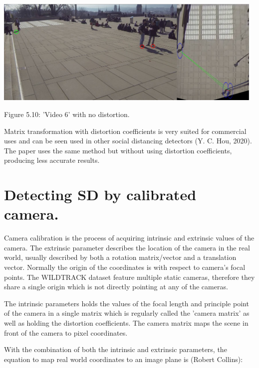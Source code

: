 \documentclass[12pt]{report}
\begin{document}
\begin{center}
	\includegraphics[width=130mm]{./images/appendix/UndistortedImageWithMatrixTransformation.JPG}
	
	{\footnotesize Figure 5.10: 'Video 6' with no distortion.}
\end{center}

Matrix transformation with distortion coefficients is very suited for commercial uses and can be seen used in other social distancing detectors (Y. C. Hou, 2020). The paper uses the same method but without using distortion coefficients, producing less accurate results.

\section{Detecting SD by calibrated camera.}

Camera calibration is the process of acquiring intrinsic and extrinsic values of the camera. The extrinsic parameter describes the location of the camera in the real world, usually described by both a rotation matrix/vector and a translation vector. Normally the origin of the coordinates is with respect to camera's focal points. The WILDTRACK dataset feature multiple static cameras, therefore they share a single origin which is not directly pointing at any of the cameras.

\vspace{2mm}

The intrinsic parameters holds the values of the focal length and principle point of the camera in a single matrix which is regularly called the 'camera matrix' as well as holding the distortion coefficients. The camera matrix maps the scene in front of the camera to pixel coordinates.
\vspace{2mm}

With the combination of both the intrinsic and extrinsic parameters, the equation to map real world coordinates to an image plane is (Robert Collins):
\end{document}
